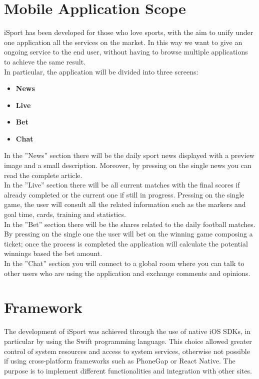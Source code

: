 \documentclass[numbers=noenddot, 12pt, a4paper, oneside]{scrbook}
\begin{document}
\section{Mobile Application Scope}
iSport has been developed for those who love sports, with the aim to unify under one application all the services on the market. In this way we want to give an ongoing service to the end user, without having to browse multiple applications to achieve the same result.\\
In particular, the application will be divided into three screens:
\begin{itemize}
	\item \textbf{News}
	\item \textbf{Live}
	\item \textbf{Bet}
	\item \textbf{Chat}
\end{itemize}
In the ”News” section there will be the daily sport news displayed with a preview image and a small description. Moreover, by pressing on the single news you can read the complete article.\\
In the ”Live” section there will be all current matches with the final scores if already completed or the current one if still in progress. Pressing on the single game, the user will consult all the related information such as the markers and goal time, cards, training and statistics.\\
In the ”Bet” section there will be the shares related to the daily football matches. By pressing on the single one the user will bet on the winning game composing a ticket; once the process is completed the application will calculate the potential winnings based the bet amount.\\
In the ”Chat” section you will connect to a global room where you can talk to other users who are using the application and exchange comments and opinions.


\section{Framework}
The development of iSport was achieved through the use of native iOS SDKs, in particular by using the Swift programming language. This choice allowed greater control of system resources and access to system services, otherwise not possible if using cross-platform frameworks such as PhoneGap or React Native. The purpose is to implement different functionalities and integration with other sites.
\end{document}
